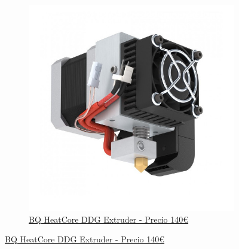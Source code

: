 \documentclass[11pt,a4paper]{article}
\begin{document}
\begin{figure}[H]
    \begin{subfigure}[b]{0.4\textwidth}
        \includegraphics[width=\textwidth,cfbox=azul_marcos 4pt 0pt]{FOTOS/EXTRUSOR6}
		\caption*{\href{http://www.bq.es}{{\footnotesize BQ HeatCore DDG Extruder - Precio 140\euro}}}
    \end{subfigure}
\end{figure}
\end{document}
